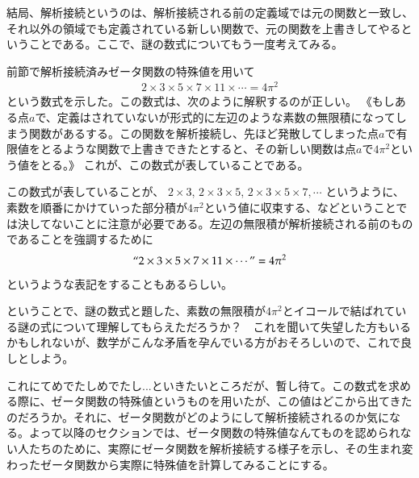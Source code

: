 \documentclass[11pt,b5paper,papersize,dvipdfmx]{jsbook}
\begin{document}
結局、解析接続というのは、解析接続される前の定義域では元の関数と一致し、それ以外の領域でも定義されている新しい関数で、元の関数を上書きしてやるということである。ここで、謎の数式についてもう一度考えてみる。\par
前節で解析接続済みゼータ関数の特殊値を用いて
\begin{align*}
  2\times 3\times 5\times 7\times 11\times\cdots = 4\pi^2
\end{align*}
という数式を示した。この数式は、次のように解釈するのが正しい。
《もしある点$a$で、定義はされていないが形式的に左辺のような素数の無限積になってしまう関数があるする。この関数を解析接続し、先ほど発散してしまった点$a$で有限値をとるような関数で上書きできたとすると、その新しい関数は点$a$で$4\pi^2$という値をとる。》
これが、この数式が表していることである。\par
この数式が表していることが、
$2\times 3$, $2\times 3\times 5$, $2\times 3\times 5\times 7, \cdots$ というように、素数を順番にかけていった部分積が$4\pi^2$という値に収束する、などということでは決してないことに注意が必要である。左辺の無限積が解析接続される前のものであることを強調するために
\begin{align*}
  ``2\times 3\times 5\times 7\times 11\times\cdots\text{''} = 4\pi^2
\end{align*}
というような表記をすることもあるらしい。\par
ということで、謎の数式と題した、素数の無限積が$4\pi^2$とイコールで結ばれている謎の式について理解してもらえただろうか？　これを聞いて失望した方もいるかもしれないが、数学がこんな矛盾を孕んでいる方がおそろしいので、これで良しとしよう。\par
これにてめでたしめでたし...といきたいところだが、暫し待て。この数式を求める際に、ゼータ関数の特殊値というものを用いたが、この値はどこから出てきたのだろうか。それに、ゼータ関数がどのようにして解析接続されるのか気になる。よって以降のセクションでは、ゼータ関数の特殊値なんてものを認められない人たちのために、実際にゼータ関数を解析接続する様子を示し、その生まれ変わったゼータ関数から実際に特殊値を計算してみることにする。
\end{document}
